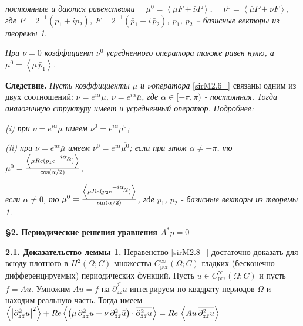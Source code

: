 \textit{постоянные и даются равенствами $\quad \mu ^{0} =\left\langle \mu F+\bar{\nu }P\right\rangle $,  $\quad \nu ^{0} =\left\langle \bar{\mu }P+\nu F\right\rangle $,  где $P=2^{-1} (p_{1} +ip_{2} )$, $F=2^{-1} (\bar{p}_{1} +i\, \bar{p}_{2} )$,   $p_{1} $, $p_{2} $  --  базисные векторы из теоремы 1.}

\textit{При $\nu =0$ коэффициент $\nu ^{0} $ усредненного оператора также равен нулю, а $\mu ^{0} =\left\langle \mu \, \bar{p}_{1} \right\rangle $.}

\textbf{Следствие.  }\textit{Пусть коэффициенты $\mu $ и $\nu $оператора  }\eqref{sirM2.6_} связаны одним из двух соотношений: \textit{$\nu =e^{i\alpha } \mu $, $\nu =e^{i\alpha } \bar{\mu }$,  где $\alpha \in [-\pi ,\pi )$ - постоянная. Тогда аналогичную структуру имеет и усредненный оператор. Подробнее:}

\textit{(i) при $\nu =e^{i\alpha } \mu $ имеем $\nu ^{0} =e^{i\alpha } \mu ^{0} $;}

\textit{(ii) при $\nu =e^{i\alpha } \bar{\mu }$ имеем $\nu ^{0} =e^{i\alpha } \overline{\mu ^{0} }$; если при этом $\alpha \ne -\pi $, то $\mu ^{0} =\frac{\left\langle \mu Re(p_{1} e^{{\raise0.5ex\hbox{$\scriptstyle -i\alpha  $}\kern-0.1em/\kern-0.15em\lower0.25ex\hbox{$\scriptstyle 2 $}} } )\right\rangle }{\cos (\alpha /2)} $,}

\textit{если $\alpha \ne 0$, то    $\mu ^{0} =\frac{\left\langle \mu Re(p_{2} e^{{\raise0.5ex\hbox{$\scriptstyle -i\alpha  $}\kern-0.1em/\kern-0.15em\lower0.25ex\hbox{$\scriptstyle 2 $}} } )\right\rangle }{\sin (\alpha /2)} $, где $p_{1} $, $p_{2} $ - базисные векторы из теоремы 1.}

\textbf{\S 2.  Периодические решения уравнения $A^{*} p=0$}

\textbf{2.1. Доказательство леммы 1.} Неравенство \eqref{sirM2.8_}  достаточно доказать для всюду плотного в $H^{2} (\Omega ;C)$ множества $C_{\mathrm{ per}}^{\infty } (\Omega ;C)$ гладких (бесконечно дифференцируемых) периодических функций. Пусть $u\in C_{\mathrm{ per}}^{\infty } (\Omega ;C)$ и пусть $f=Au$. Умножим $Au=f$ на $\overline{\partial _{z\bar{z}}^{2} u}$ интегрируем по квадрату периодов $\Omega $ и находим реальную часть. Тогда имеем   $\left\langle \left|\partial _{z\bar{z}}^{2} u\right|^{2} \right\rangle +Re\left\langle \left(\mu \, \partial _{zz}^{2} u+\nu \, \partial _{\bar{z}\bar{z}}^{2} \bar{u}\right)\cdot \overline{\partial _{\bar{z}\bar{z}}^{2} u}\right\rangle =Re\, \left\langle Au{\kern 1pt} {\kern 1pt} \overline{\partial _{z\bar{z}}^{2} u}\right\rangle $


